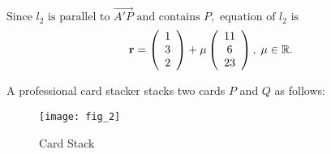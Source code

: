 \documentclass[12pt, a4 paper]{article}
\begin{document}
\begin{outline}[enumerate]
					${\textrm{Since }}{l_2}{\textrm{ is parallel to }}\overrightarrow {A'P} {\textrm{ and contains }}P,{\textrm{ equation of }}{l_2}{\textrm{ is}}$
					\begin{align*}
						{\bf{r}} = \left( {\begin{array}{*{20}{c}}1 \\3\\2\end{array}} \right) + \mu \left( {\begin{array}{*{20}{c}}{11}\\6\\{23}\end{array}} \right),\;\mu  \in \mathbb{R}.
					\end{align*}
										
										
					\color{black}
					\newpage
					\1 A professional card stacker stacks two cards $P$ and $Q$ as follows:
					\begin{figure}[h]
						\centering
						\texttt{[image: fig\_2]}
						\caption{Card Stack}
					\end{figure}
															        

\end{outline}
\end{document}
